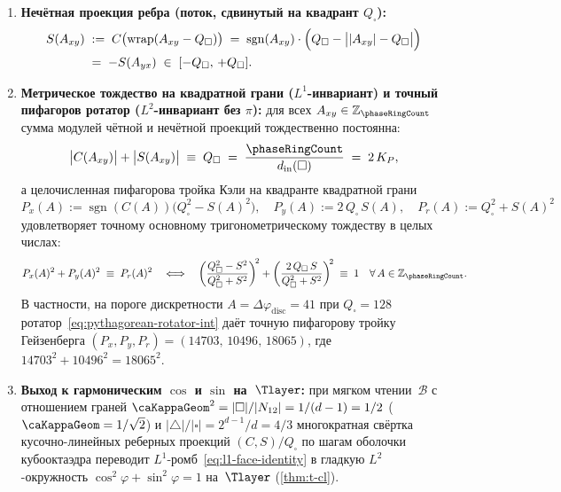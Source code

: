 \begin{theorem}
\begin{enumerate}[label=(\roman*)]
\begin{equation}
  \end{equation}
\item \textbf{Нечётная проекция ребра (поток, сдвинутый на квадрант $Q_\square$):}
  \begin{equation}
  \label{eq:discrete-sin-closed}
  \begin{aligned}
    S(A_{xy}) &\;:=\; C\bigl(\mathrm{wrap}(A_{xy} - Q_\square)\bigr)
    \;=\; \operatorname{sgn}(A_{xy})\cdot\Bigl(Q_\square - \bigl||A_{xy}| - Q_\square\bigr|\Bigr)\\
    &\;=\; -S(A_{yx}) \;\in\; [-Q_\square,\,+Q_\square].
  \end{aligned}
  \end{equation}
\item \textbf{Метрическое тождество на квадратной грани ($L^1$-инвариант) и точный пифагоров ротатор ($L^2$-инвариант без $\pi$):}
  для всех $A_{xy}\in\mathbb{Z}_{\phaseRingCount}$ сумма модулей чётной и нечётной проекций тождественно постоянна:
  \begin{equation}
  \label{eq:l1-face-identity}
    \bigl|C(A_{xy})\bigr| + \bigl|S(A_{xy})\bigr| \;\equiv\; Q_\square \;=\; \frac{\phaseRingCount}{d_{\mathrm{in}}(\square)} \;=\; 2\,K_P,
  \end{equation}
  а целочисленная пифагорова тройка Кэли на квадранте квадратной грани
  \begin{equation}
  \label{eq:pythagorean-rotator-int}
    P_x(A) := \operatorname{sgn}(C(A))\bigl(Q_\square^2 - S(A)^2\bigr),\quad
    P_y(A) := 2\,Q_\square\,S(A),\quad
    P_r(A) := Q_\square^2 + S(A)^2
  \end{equation}
  удовлетворяет точному основному тригонометрическому тождеству в целых числах:
  \begin{equation}
  \label{eq:pythagorean-identity-int}
    P_x(A)^2 + P_y(A)^2 \;\equiv\; P_r(A)^2
    \quad\Longleftrightarrow\quad
    \left(\frac{Q_\square^2 - S^2}{Q_\square^2 + S^2}\right)^{\!2} + \left(\frac{2\,Q_\square\,S}{Q_\square^2 + S^2}\right)^{\!2} \;\equiv\; 1
    \quad\forall\,A\in\mathbb{Z}_{\phaseRingCount}.
  \end{equation}
  В частности, на пороге дискретности $A = \Delta\varphi_{\mathrm{disc}} = 41$ при $Q_\square = 128$ ротатор~\eqref{eq:pythagorean-rotator-int}
  даёт точную пифагорову тройку Гейзенберга $(P_x, P_y, P_r) = (14703,\,10496,\,18065)$, где $14703^2 + 10496^2 = 18065^2$.
\item \textbf{Выход к гармоническим $\cos$ и $\sin$ на~$\Tlayer$:}
  при мягком чтении~$\mathcal{B}$ с отношением граней $\caKappaGeom^2 = |\square|/|N_{12}| = 1/(d-1) = 1/2$ ($\caKappaGeom = 1/\sqrt{2}$)
  и $|\triangle|/|\square| = 2^{d-1}/d = 4/3$ многократная свёртка кусочно-линейных реберных проекций
  $(C,S)/Q_\square$ по шагам оболочки кубооктаэдра переводит $L^1$-ромб~\eqref{eq:l1-face-identity}
  в гладкую $L^2$-окружность $\cos^2\varphi + \sin^2\varphi = 1$ на~$\Tlayer$ (\cref{thm:t-cl}).
\end{enumerate}
\end{theorem}

